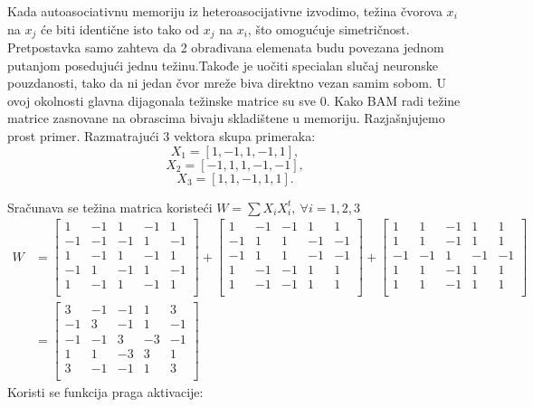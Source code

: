 \documentclass[fontsize=11bp, paper=a4]{scrarticle}
\begin{document}
Kada autoasociativnu memoriju iz heteroasocijativne izvodimo, težina čvorova $x_i$ na $x_j$ će biti identične isto tako od $x_j$ na $x_i$, što omogućuje simetričnost. Pretpostavka samo zahteva da 2 obrađivana elemenata budu povezana jednom putanjom posedujući jednu težinu.Takođe je uočiti specialan slučaj neuronske pouzdanosti, tako da ni jedan čvor mreže biva direktno vezan samim sobom. 
U ovoj okolnosti glavna dijagonala težinske matrice su sve 0. 
Kako BAM radi težine matrice zasnovane na obrascima bivaju skladištene u memoriju. Razjašnjujemo prost primer. Razmatrajući 3 vektora skupa primeraka:
$$X_1 = [1, -1, 1, -1, 1],$$
$$X_2 = [-1, 1, 1, -1, -1],$$
$$X_3 = [1, 1, -1, 1, 1].$$

Sračunava se težina matrica koristeći $W = \sum X_i X_i^t,\ \forall i = 1,2,3$ 
$$
\begin{aligned}
    W & = \begin{bmatrix}
        1 & -1 & 1 & -1 & 1 \\
        -1 & -1 & -1 & 1 & -1 \\
        1 & -1 & 1 & -1 & 1 \\
        -1 & 1 & -1 & 1 & -1 \\
        1 & -1 & 1 & -1 & 1 \\
    \end{bmatrix} + \begin{bmatrix}
        1 & -1 & -1 & 1 & 1 \\
       - 1 & 1 & 1 & -1 & -1 \\
        -1 & 1 & 1 & -1 & -1 \\
        1 & -1 & -1 & 1 & 1 \\
        1 & -1 & -1 & 1 & 1 \\
    \end{bmatrix} + \begin{bmatrix}
        1 & 1 & -1 & 1 & 1 \\
        1 & 1 & -1 & 1 & 1 \\
        -1 & -1 & 1 & -1 &- 1 \\
        1 & 1 & -1 & 1 & 1 \\
        1 & 1 & -1 & 1 & 1 \\
    \end{bmatrix}\\
    &= \begin{bmatrix}
        3 & -1 & -1 & 1 & 3 \\
        -1 & 3 & -1 & 1 & -1 \\
        -1 & -1 & 3 & -3 & -1 \\
        1 & 1 & -3 & 3 & 1 \\
        3 & -1 & -1 & 1 & 3 \\
    \end{bmatrix}
\end{aligned}
$$ 
Koristi se funkcija praga aktivacije:
\end{document}
